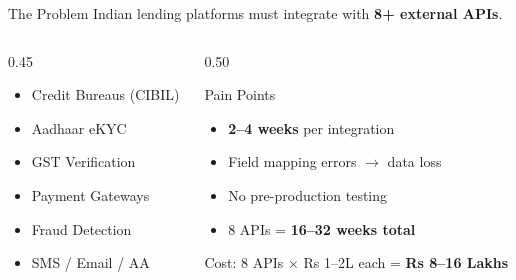 \documentclass[aspectratio=169,11pt]{beamer}
\begin{document}
\begin{frame}{The Problem}
{\large Indian lending platforms must integrate with \textbf{8+ external APIs}.}
\vspace{0.4em}

\begin{columns}[T]
\begin{column}{0.45\textwidth}
\begin{itemize}
\item Credit Bureaus (CIBIL)
\item Aadhaar eKYC
\item GST Verification
\item Payment Gateways
\item Fraud Detection
\item SMS / Email / AA
\end{itemize}
\end{column}
\begin{column}{0.50\textwidth}
\begin{block}{\textcolor{err}{Pain Points}}
\begin{itemize}
\item \textbf{2--4 weeks} per integration
\item Field mapping errors $\to$ data loss
\item No pre-production testing
\item 8 APIs = \textbf{16--32 weeks total}
\end{itemize}
\end{block}
\vspace{0.3em}
{\small\textcolor{warn}{Cost:} 8 APIs $\times$ Rs 1--2L each = \textbf{Rs 8--16 Lakhs}}
\end{column}
\end{columns}
\end{frame}
\end{document}
